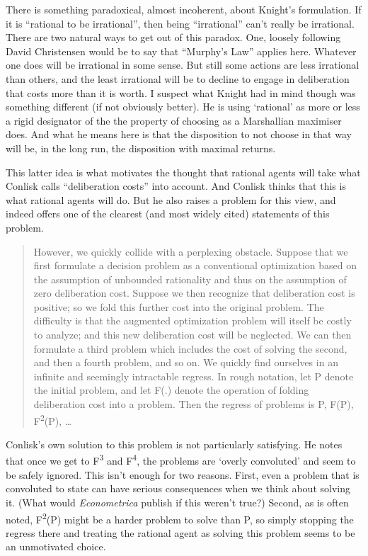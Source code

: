 \documentclass[
  11pt,
]{book}
\begin{document}
There is something paradoxical, almost incoherent, about Knight's formulation. If it is ``rational to be irrational'', then being ``irrational'' can't really be irrational. There are two natural ways to get out of this paradox. One, loosely following David Christensen \citeyearpar{Christensen2007} would be to say that ``Murphy's Law'' applies here. Whatever one does will be irrational in some sense. But still some actions are less irrational than others, and the least irrational will be to decline to engage in deliberation that costs more than it is worth. I suspect what Knight had in mind though was something different (if not obviously better). He is using `rational' as more or less a rigid designator of the the property of choosing as a Marshallian maximiser does. And what he means here is that the disposition to not choose in that way will be, in the long run, the disposition with maximal returns.

This latter idea is what motivates the thought that rational agents will take what Conlisk calls ``deliberation costs'' into account. And Conlisk thinks that this is what rational agents will do. But he also raises a problem for this view, and indeed offers one of the clearest (and most widely cited) statements of this problem.

\begin{quote}
However, we quickly collide with a perplexing obstacle. Suppose that we first formulate a decision problem as a conventional optimization based on the assumption of unbounded rationality and thus on the assumption of zero deliberation cost. Suppose we then recognize that deliberation cost is positive; so we fold this further cost into the original problem. The difficulty is that the augmented optimization problem will itself be costly to analyze; and this new deliberation cost will be neglected. We can then formulate a third problem which includes the cost of solving the second, and then a fourth problem, and so on. We quickly find ourselves in an infinite and seemingly intractable regress. In rough notation, let P denote the initial problem, and let F(.) denote the operation of folding deliberation cost into a problem. Then the regress of problems is P, F(P), F\textsuperscript{2}(P), \ldots{} \citep[ 687]{Conlisk1996}
\end{quote}

Conlisk's own solution to this problem is not particularly satisfying. He notes that once we get to F\textsuperscript{3} and F\textsuperscript{4}, the problems are `overly convoluted' and seem to be safely ignored. This isn't enough for two reasons. First, even a problem that is convoluted to state can have serious consequences when we think about solving it. (What would \emph{Econometrica} publish if this weren't true?) Second, as is often noted, F\textsuperscript{2}(P) might be a harder problem to solve than P, so simply stopping the regress there and treating the rational agent as solving this problem seems to be an unmotivated choice.
\end{document}
